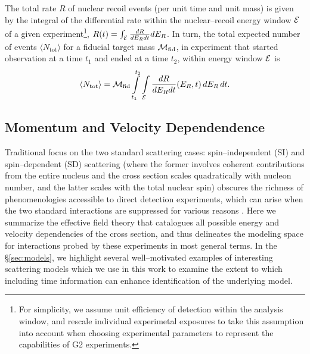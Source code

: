 \documentclass[11pt]{article}
\newcommand{\beq}{\begin{equation}} \newcommand{\eeq}{\end{equation}}
\newcommand{\sjwColor}{red}
\newcommand{\sjwtt}[1]{{\color{\sjwColor}\tt #1}}
\begin{document}
The total rate $R$ of nuclear recoil events (per unit time and unit mass) is given by the integral of the differential rate within the nuclear--recoil energy window ${\cal E}$ of a given experiment\footnote{For simplicity, we assume unit efficiency of detection within the analysis window, and rescale individual experimetal exposures to take this assumption into account when choosing experimental parameters to represent the capabilities of G2 experiments.}, $R(t)=\int_{\cal E} \frac{dR}{dE_R dt} dE_R$. In turn, the total expected number of events $\langle N_\mathrm{tot}\rangle$ for a fiducial target mass ${\cal M}_\textrm{fid}$, in experiment that started observation at a time $t_1$ and ended at a time $t_2$, within energy window ${\cal E}$ is
\beq
\langle N_\mathrm{tot}\rangle =  \cM_\textrm{fid} \int\limits_{t_1}^{t_2} \int\limits_\cE  \frac{dR}{dE_R dt}(E_R,t)\,dE_R \,dt.
\eeq

\subsection{Momentum and Velocity Dependendence}
\label{subsec:momentum_velocity}

Traditional focus on the two standard scattering cases: spin--independent (SI) and spin--dependent (SD) scattering (where the former involves coherent contributions from the entire nucleus and the cross section scales quadratically with nucleon number, and the latter scales with the total nuclear spin) obscures the richness of phenomenologies accessible to direct detection experiments, which can arise when the two standard interactions are suppressed for various reasons \cite{}. Here we summarize the effective field theory that catalogues all possible energy and velocity dependencies of the cross section, and thus delineates the modeling space for interactions probed by these experiments in most general terms. In the \S\ref{sec:models}, we highlight several well--motivated examples of interesting scattering models which we use in this work to examine the extent to which including time information can enhance identification of the underlying model.

\end{document}

